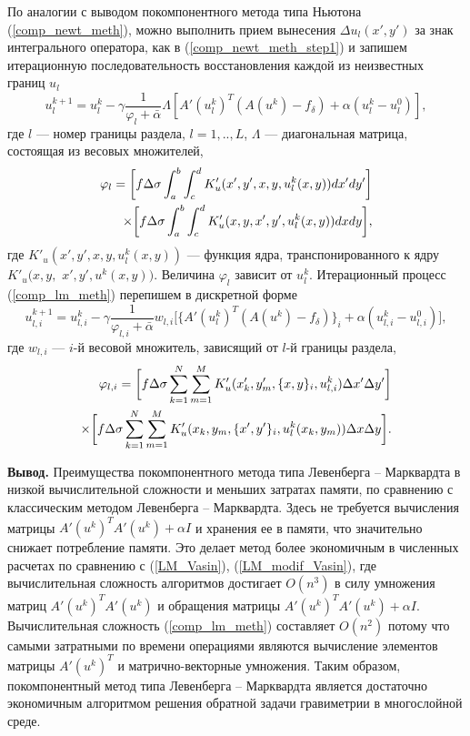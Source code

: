 По аналогии с выводом покомпонентного метода типа Ньютона (\ref{comp_newt_meth}), можно выполнить прием вынесения $\Delta u_l(x',y')$ за знак интегрального оператора, как в (\ref{comp_newt_meth_step1}) и запишем итерационную последовательность восстановления каждой из неизвестных границ $u_l$
\begin{equation}\label{comp_lm_meth}
u_l^{k+1}=u_l^k-\gamma\frac{1}{\varphi_l+\bar{\alpha}}\Lambda[ A'(u_l^k)^T(A(u^k)-f_\delta)+\alpha (u_l^k-u_l^0)],
\end{equation}
где $l$ --- номер границы раздела, $l=1,..,L$, $\Lambda$ --- диагональная матрица, состоящая из весовых множителей, 
\begin{equation*}
\begin{aligned}
\varphi_l=\bigg[ f\Delta\sigma\int_{a}^{b}\int_{c}^{d}
K'_u(x',y', x, y, u_l^k(x,y))dx'dy'\bigg] \notag \\ \times\bigg[f\Delta\sigma\int_{a}^{b}\int_{c}^{d}K'_u(x,y, x',y',u_l^k(x,y))dxdy\bigg], 
\end{aligned}
\end{equation*} 
где $K'_u(x',y', x, y, u_l^k(x,y))$ --- функция ядра, транспонированного к ядру $K'_u(x,y,$ $ x',y',u^k(x,y))$. Величина $\varphi_l$ зависит от $u_l^k$.
Итерационный процесс (\ref{comp_lm_meth}) перепишем в дискретной форме
\begin{equation}\label{comp_lm_meth_disc}
u_{l,i}^{k+1}=u_{l,i}^k-\gamma\frac{1}{\varphi_{l,i}+\bar{\alpha}}w_{l,i}\bigg[ \{A'(u_l^k)^T(A(u^k)-f_\delta)\}_i+\alpha (u_{l,i}^k-u_{l,i}^0)\bigg],
\end{equation}
где $w_{l,i}$ --- $i$-й весовой множитель, зависящий от $l$-й границы раздела,
\begin{equation*}
\begin{aligned}
\varphi_{l,i}=\bigg[ f\Delta\sigma\sum\limits_{k=1}^{N}
\sum\limits_{m=1}^{M}
K'_u(x'_k,y'_m, \{x, y\}_i, u_{l,i}^k) \Delta x' \Delta y'\bigg] \notag \\ \times\bigg[f\Delta\sigma\sum\limits_{k=1}^{N}
\sum\limits_{m=1}^{M}K'_u(x_k,y_m, \{x',y'\}_i,u_l^k(x_k,y_m))\Delta x \Delta y\bigg]. 
\end{aligned}
\end{equation*}

{\bfseries\large Вывод.}
Преимущества покомпонентного метода типа Левенберга -- Марквардта в низкой вычислительной сложности и меньших затратах памяти, по сравнению с классическим методом Левенберга -- Марквардта. Здесь не требуется вычисления матрицы $A'(u^k)^T A'(u^k)+\alpha I$ и хранения ее в памяти, что значительно снижает потребление памяти. Это делает метод более экономичным в численных расчетах по сравнению с (\ref{LM_Vasin}), (\ref{LM_modif_Vasin}), где вычислительная сложность алгоритмов достигает $O(n^3)$ в силу умножения матриц $A'(u^k)^T A'(u^k)$ и обращения матрицы $A'(u^k)^T A'(u^k)+\alpha I$. Вычислительная сложность (\ref{comp_lm_meth}) составляет $O(n^2)$ потому что самыми затратными по времени операциями являются вычисление элементов матрицы $A'(u^k)^T$ и матрично-векторные умножения. Таким образом, покомпонентный метод типа Левенберга -- Марквардта является достаточно экономичным алгоритмом решения обратной задачи гравиметрии в многослойной среде.

